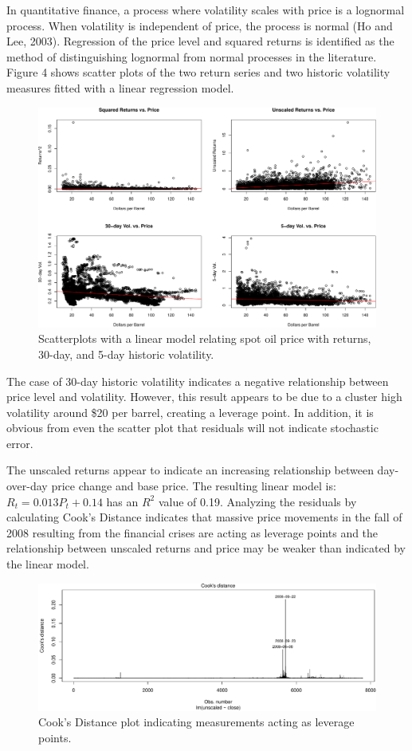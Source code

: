 \documentclass[]{article}
\begin{document}
In quantitative finance, a process where volatility scales with price is
a lognormal process. When volatility is independent of price, the
process is normal (Ho and Lee, 2003). Regression of the price level and
squared returns is identified as the method of distinguishing lognormal
from normal processes in the literature. Figure 4 shows scatter plots of
the two return series and two historic volatility measures fitted with a
linear regression model.

\begin{figure}[htbp]
\centering
\includegraphics{Figs/unnamed-chunk-8-1.pdf}
\caption{Scatterplots with a linear model relating spot oil price with
returns, 30-day, and 5-day historic volatility.}
\end{figure}

The case of 30-day historic volatility indicates a negative relationship
between price level and volatility. However, this result appears to be
due to a cluster high volatility around \$20 per barrel, creating a
leverage point. In addition, it is obvious from even the scatter plot
that residuals will not indicate stochastic error.

The unscaled returns appear to indicate an increasing relationship
between day-over-day price change and base price. The resulting linear
model is: \(R_t = 0.013P_t+0.14\) has an \(R^2\) value of 0.19.
Analyzing the residuals by calculating Cook's Distance indicates that
massive price movements in the fall of 2008 resulting from the financial
crises are acting as leverage points and the relationship between
unscaled returns and price may be weaker than indicated by the linear
model.

\begin{figure}[htbp]
\centering
\includegraphics{Figs/unnamed-chunk-9-1.pdf}
\caption{Cook's Distance plot indicating measurements acting as leverage
points.}
\end{figure}
\end{document}

